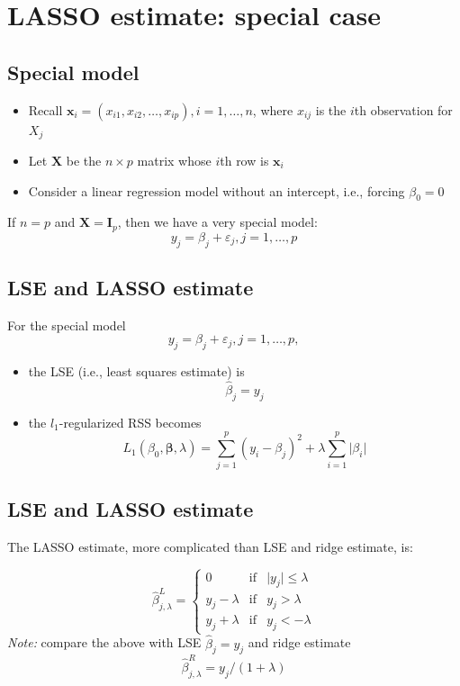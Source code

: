\documentclass[]{article}
\providecommand{\tightlist}{%
  \setlength{\itemsep}{0pt}\setlength{\parskip}{0pt}}
\begin{document}
\section{LASSO estimate: special
case}\label{lasso-estimate-special-case}

\subsection{Special model}\label{special-model-1}

\begin{itemize}
\tightlist
\item
  Recall \(\mathbf{x}_i=(x_{i1},x_{i2},\ldots,x_{ip}),i=1,\ldots,n\),
  where \(x_{ij}\) is the \(i\)th observation for \(X_j\)
\item
  Let \(\mathbf{X}\) be the \(n \times p\) matrix whose \(i\)th row is
  \(\mathbf{x}_i\)
\item
  Consider a linear regression model without an intercept, i.e., forcing
  \(\beta_0=0\)
\end{itemize}

If \(n=p\) and \(\mathbf{X}=\mathbf{I}_p\), then we have a very special
model: \[y_j = \beta_j+\varepsilon_j,j=1,\ldots,p\]

\subsection{LSE and LASSO estimate}\label{lse-and-lasso-estimate}

For the special model \[y_j = \beta_j+\varepsilon_j,j=1,\ldots,p,\]

\begin{itemize}
\tightlist
\item
  the LSE (i.e., least squares estimate) is \[\hat{\beta}_j=y_j\]
\item
  the \(l_1\)-regularized RSS becomes \[
  L_1(\beta_{0},\boldsymbol{\beta},\lambda)= \sum_{j=1}^p (y_i - \beta_j)^2 + \lambda \sum_{i=1}^p \vert\beta_i\vert
  \]
\end{itemize}

\subsection{LSE and LASSO estimate}\label{lse-and-lasso-estimate-1}

The LASSO estimate, more complicated than LSE and ridge estimate, is:

\[\hat{\beta}_{j,\lambda}^L = \left\{
\begin{array}
{lll}
0 & \text{if} & \vert y_j \vert \le \lambda \\
y_j -\lambda & \text{if} & y_j > \lambda \\
y_j +\lambda & \text{if} & y_j < -\lambda
\end{array}\right.
\] \emph{Note:} compare the above with LSE \(\hat{\beta}_j=y_j\) and
ridge estimate \[\hat{\beta}_{j,\lambda}^R=y_j/(1+\lambda)\]
\end{document}
